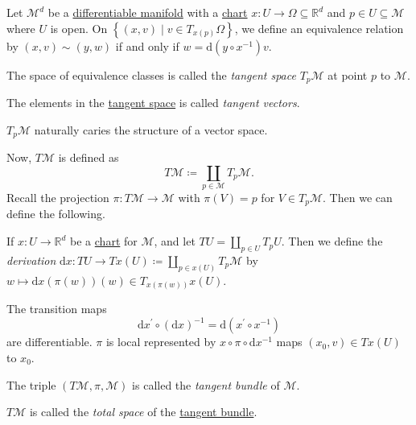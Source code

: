 \begin{definition*}
	Let \(\mathcal{M}^d \) be a \hyperref[def:smooth-manifold]{differentiable manifold} with a \hyperref[def:coordinate-chart]{chart} \(x\colon U \to \Omega \subseteq \mathbb{R} ^d\) and \(p\in U \subseteq \mathcal{M} \) where \(U\) is open. On \(\left\{ (x, v) \mid v\in T_{x(p)}\Omega \right\}\), we define an equivalence relation by \((x, v)\sim (y, w)\) if and only if \(w = \mathrm{d} (y \circ x ^{-1} )v\).

	\begin{definition}\label{def:tangent-space}
		The space of equivalence classes is called the \emph{tangent space} \(T_p \mathcal{M} \) at point \(p\) to \(\mathcal{M} \).
	\end{definition}
	\begin{definition}\label{def:tangent-vector}
		The elements in the \hyperref[def:tangent-space]{tangent space} is called \emph{tangent vectors}.
	\end{definition}
\end{definition*}

\begin{remark}
	\(T_p \mathcal{M} \) naturally caries the structure of a vector space.
\end{remark}

Now, \(T \mathcal{M} \) is defined as
\[
	T\mathcal{M} \coloneqq \coprod _{p\in \mathcal{M} }T_p \mathcal{M} .
\]
Recall the projection \(\pi \colon T\mathcal{M} \to \mathcal{M} \) with \(\pi (V) = p\) for \(V\in T_p \mathcal{M} \). Then we can define the following.

\begin{definition}[Derivation]\label{def:derivation}
	If \(x\colon U \to \mathbb{R} ^d\) be a \hyperref[def:coordinate-chart]{chart} for \(\mathcal{M} \), and let \(TU = \coprod_{p\in U} T_p U\). Then we define the \emph{derivation} \(\mathrm{d} x\colon TU \to T x(U) \coloneqq \coprod_{p\in x(U)} T_p \mathcal{M} \) by \(w \mapsto \mathrm{d} x(\pi (w))(w)\in T_{x(\pi (w))} x(U)\).
\end{definition}

The transition maps
\[
	\mathrm{d} x^\prime \circ (\mathrm{d} x)^{-1}
	= \mathrm{d} (x^\prime \circ x ^{-1} )
\]
are differentiable. \(\pi \) is local represented by \(x \circ \pi \circ \mathrm{d} x ^{-1} \) maps \((x_0, v)\in Tx(U)\) to \(x_0\).

\begin{definition}\label{def:tangent-bundle}
	The triple \((T\mathcal{M} , \pi , \mathcal{M} )\) is called the \emph{tangent bundle} of \(\mathcal{M} \).

	\begin{definition}\label{def:tangent-bundle-total-space}
		\(T\mathcal{M} \) is called the \emph{total space} of the \hyperref[def:tangent-bundle]{tangent bundle}.
	\end{definition}
\end{definition}

